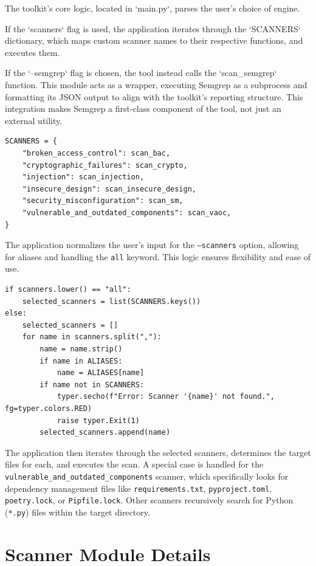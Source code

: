 The toolkit's core logic, located in `main.py`, parses the user's choice of engine.

If the `scanners` flag is used, the application iterates through the `SCANNERS` dictionary, which maps custom scanner names to their respective functions, and executes them.

If the `--semgrep` flag is chosen, the tool instead calls the `scan\_semgrep` function. This module acts as a wrapper, executing Semgrep as a subprocess and formatting its JSON output to align with the toolkit's reporting structure. This integration makes Semgrep a first-class component of the tool, not just an external utility.


\begin{verbatim}
SCANNERS = {
    "broken_access_control": scan_bac,
    "cryptographic_failures": scan_crypto,
    "injection": scan_injection,
    "insecure_design": scan_insecure_design,
    "security_misconfiguration": scan_sm,
    "vulnerable_and_outdated_components": scan_vaoc,
}
\end{verbatim}

The application normalizes the user's input for the \texttt{--scanners} option, allowing for aliases and handling the \texttt{all} keyword. This logic ensures flexibility and ease of use.

\begin{verbatim}
if scanners.lower() == "all":
    selected_scanners = list(SCANNERS.keys())
else:
    selected_scanners = []
    for name in scanners.split(","):
        name = name.strip()
        if name in ALIASES:
            name = ALIASES[name]
        if name not in SCANNERS:
            typer.secho(f"Error: Scanner '{name}' not found.", fg=typer.colors.RED)
            raise typer.Exit(1)
        selected_scanners.append(name)
\end{verbatim}

The application then iterates through the selected scanners, determines the target files for each, and executes the scan. A special case is handled for the \texttt{vulnerable\_and\_outdated\_components} scanner, which specifically looks for dependency management files like \texttt{requirements.txt}, \texttt{pyproject.toml}, \texttt{poetry.lock}, or \texttt{Pipfile.lock}. Other scanners recursively search for Python (\texttt{*.py}) files within the target directory.

\section{Scanner Module Details}
\label{sec:scanner_modules}

